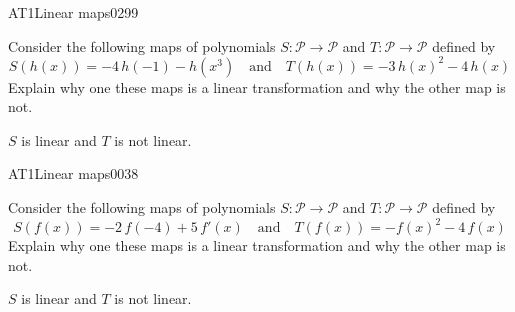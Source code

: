 \begin{exercise}{AT1}{Linear maps}{0299} 
\begin{exerciseStatement} 

 Consider the following maps of polynomials \(S:\mathcal{P}\rightarrow\mathcal{P}\) and \(T:\mathcal{P}\rightarrow\mathcal{P}\) defined by \[
            S(h(x))=
                    -4 \, h\left(-1\right) - h\left(x^{3}\right)
                \hspace{1em} \text{and} \hspace{1em}
            T(h(x))=
                    -3 \, h\left(x\right)^{2} - 4 \, h\left(x\right)
        \] Explain why one these maps is a linear transformation and why the other map is not. 

 \end{exerciseStatement}
 \begin{exerciseAnswer} 

\(S\) is linear and \(T\) is not linear.

 \end{exerciseAnswer}
 \end{exercise}



\begin{exercise}{AT1}{Linear maps}{0038} 
\begin{exerciseStatement} 

 Consider the following maps of polynomials \(S:\mathcal{P}\rightarrow\mathcal{P}\) and \(T:\mathcal{P}\rightarrow\mathcal{P}\) defined by \[
            S(f(x))=
                    -2 \, f\left(-4\right) + 5 \, f'\left(x\right)
                \hspace{1em} \text{and} \hspace{1em}
            T(f(x))=
                    -f\left(x\right)^{2} - 4 \, f\left(x\right)
        \] Explain why one these maps is a linear transformation and why the other map is not. 

 \end{exerciseStatement}
 \begin{exerciseAnswer} 

\(S\) is linear and \(T\) is not linear.

 \end{exerciseAnswer}
 \end{exercise}


\newpage




